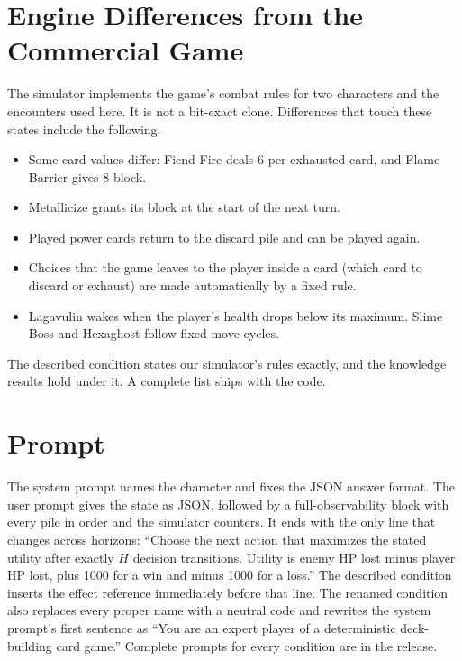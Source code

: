 \section{Engine Differences from the Commercial Game}
\label{app:engine}

The simulator implements the game's combat rules for two characters and the encounters used here. It is not a bit-exact clone. Differences that touch these states include the following.
\begin{itemize}
\item Some card values differ: Fiend Fire deals 6 per exhausted card, and Flame Barrier gives 8 block.
\item Metallicize grants its block at the start of the next turn.
\item Played power cards return to the discard pile and can be played again.
\item Choices that the game leaves to the player inside a card (which card to discard or exhaust) are made automatically by a fixed rule.
\item Lagavulin wakes when the player's health drops below its maximum. Slime Boss and Hexaghost follow fixed move cycles.
\end{itemize}
The described condition states our simulator's rules exactly, and the knowledge results hold under it. A complete list ships with the code.

\section{Prompt}
\label{app:prompt}

The system prompt names the character and fixes the JSON answer format. The user prompt gives the state as JSON, followed by a full-observability block with every pile in order and the simulator counters. It ends with the only line that changes across horizons: ``Choose the next action that maximizes the stated utility after exactly $H$ decision transitions. Utility is enemy HP lost minus player HP lost, plus 1000 for a win and minus 1000 for a loss.'' The described condition inserts the effect reference immediately before that line. The renamed condition also replaces every proper name with a neutral code and rewrites the system prompt's first sentence as ``You are an expert player of a deterministic deck-building card game.'' Complete prompts for every condition are in the release.
